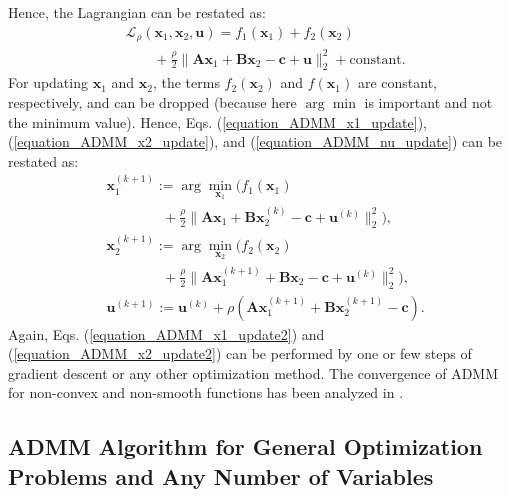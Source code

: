 \documentclass[lang=cn,10pt]{gorgeousnbook}
\numberwithin{equation}{section}%
\numberwithin{figure}{section}%
\begin{document}
Hence, the Lagrangian can be restated as:
\begin{equation}\label{equation_ADMM_augmented_Lagrangian_simplified}
\begin{aligned}
&\mathcal{L}_\rho(\boldsymbol{x}_1, \boldsymbol{x}_2, \boldsymbol{u}) = f_1(\boldsymbol{x}_1) + f_2(\boldsymbol{x}_2) \\
&~~~~~~~~~ + \frac{\rho}{2} \big\|\boldsymbol{A} \boldsymbol{x}_1 + \boldsymbol{B} \boldsymbol{x}_2 - \boldsymbol{c} + \boldsymbol{u}\big\|_2^2 + \text{constant}.
\end{aligned}
\end{equation}
For updating $\boldsymbol{x}_1$ and $\boldsymbol{x}_2$, the terms $f_2(\boldsymbol{x}_2)$ and $f(\boldsymbol{x}_1)$ are constant, respectively, and can be dropped (because here $\arg\min$ is important and not the minimum value). 
Hence, Eqs. (\ref{equation_ADMM_x1_update}), (\ref{equation_ADMM_x2_update}), and (\ref{equation_ADMM_nu_update}) can be restated as:
\begin{align}
& \boldsymbol{x}_1^{(k+1)} := \arg\min_{\boldsymbol{x}_1} \Big(f_1(\boldsymbol{x}_1) \nonumber \\
&~~~~~~~~~~~~~~~~~~ + \frac{\rho}{2} \big\|\boldsymbol{A} \boldsymbol{x}_1 + \boldsymbol{B} \boldsymbol{x}_2^{(k)} - \boldsymbol{c} + \boldsymbol{u}^{(k)}\big\|_2^2 \Big), \label{equation_ADMM_x1_update2} \\
& \boldsymbol{x}_2^{(k+1)} := \arg\min_{\boldsymbol{x}_2} \Big(f_2(\boldsymbol{x}_2) \nonumber \\
&~~~~~~~~~~~~~~~~~~ + \frac{\rho}{2} \big\|\boldsymbol{A} \boldsymbol{x}_1^{(k+1)} + \boldsymbol{B} \boldsymbol{x}_2 - \boldsymbol{c} + \boldsymbol{u}^{(k)}\big\|_2^2 \Big), \label{equation_ADMM_x2_update2} \\
& \boldsymbol{u}^{(k+1)} := \boldsymbol{u}^{(k)} + \rho (\boldsymbol{A} \boldsymbol{x}_1^{(k+1)} + \boldsymbol{B} \boldsymbol{x}_2^{(k+1)} - \boldsymbol{c}). \label{equation_ADMM_nu_update2}
\end{align}
Again, Eqs. (\ref{equation_ADMM_x1_update2}) and (\ref{equation_ADMM_x2_update2}) can be performed by one or few steps of gradient descent or any other optimization method. The convergence of ADMM for non-convex and non-smooth functions has been analyzed in \cite{wang2019global}.

\subsection{ADMM Algorithm for General Optimization Problems and Any Number of Variables}
\end{document}
